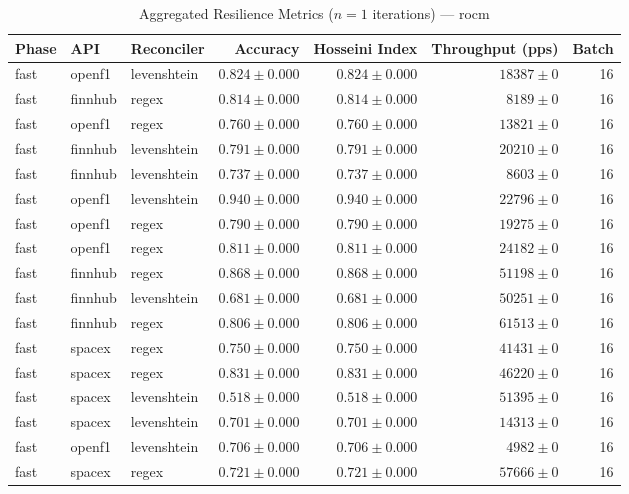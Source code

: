 
\begin{table}[htbp]
\caption{Aggregated Resilience Metrics ($n=1$ iterations) --- rocm}
\begin{tabular}{l l l r r r r}
\hline
Phase & API & Reconciler & Accuracy & Hosseini Index & Throughput (pps) & Batch \\
\hline
fast & openf1 & levenshtein & $0.824\pm0.000$ & $0.824\pm0.000$ & $18387\pm0$ & 16 \\
fast & finnhub & regex & $0.814\pm0.000$ & $0.814\pm0.000$ & $8189\pm0$ & 16 \\
fast & openf1 & regex & $0.760\pm0.000$ & $0.760\pm0.000$ & $13821\pm0$ & 16 \\
fast & finnhub & levenshtein & $0.791\pm0.000$ & $0.791\pm0.000$ & $20210\pm0$ & 16 \\
fast & finnhub & levenshtein & $0.737\pm0.000$ & $0.737\pm0.000$ & $8603\pm0$ & 16 \\
fast & openf1 & levenshtein & $0.940\pm0.000$ & $0.940\pm0.000$ & $22796\pm0$ & 16 \\
fast & openf1 & regex & $0.790\pm0.000$ & $0.790\pm0.000$ & $19275\pm0$ & 16 \\
fast & openf1 & regex & $0.811\pm0.000$ & $0.811\pm0.000$ & $24182\pm0$ & 16 \\
fast & finnhub & regex & $0.868\pm0.000$ & $0.868\pm0.000$ & $51198\pm0$ & 16 \\
fast & finnhub & levenshtein & $0.681\pm0.000$ & $0.681\pm0.000$ & $50251\pm0$ & 16 \\
fast & finnhub & regex & $0.806\pm0.000$ & $0.806\pm0.000$ & $61513\pm0$ & 16 \\
fast & spacex & regex & $0.750\pm0.000$ & $0.750\pm0.000$ & $41431\pm0$ & 16 \\
fast & spacex & regex & $0.831\pm0.000$ & $0.831\pm0.000$ & $46220\pm0$ & 16 \\
fast & spacex & levenshtein & $0.518\pm0.000$ & $0.518\pm0.000$ & $51395\pm0$ & 16 \\
fast & spacex & levenshtein & $0.701\pm0.000$ & $0.701\pm0.000$ & $14313\pm0$ & 16 \\
fast & openf1 & levenshtein & $0.706\pm0.000$ & $0.706\pm0.000$ & $4982\pm0$ & 16 \\
fast & spacex & regex & $0.721\pm0.000$ & $0.721\pm0.000$ & $57666\pm0$ & 16 \\

\end{tabular}
\end{table}
